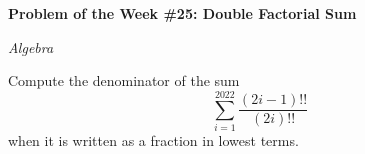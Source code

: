 \begin{potw}\vspace{5pt}
{\large\textbf{Problem of the Week \#25: Double Factorial Sum}}\vspace{5pt}

\textit{Algebra}\V

Compute the denominator of the sum
\[\sum_{i=1}^{2022} \frac{(2i-1)!!}{(2i)!!}\]
when it is written as a fraction in lowest terms.
\end{potw}\V

